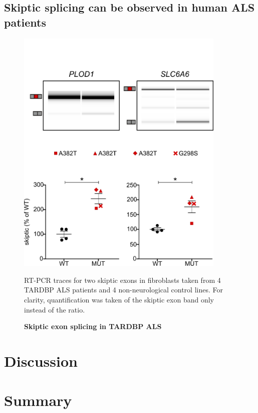 \subsection{Skiptic splicing can be observed in human ALS patients}
\begin{figure}[h!]
	\begin{center}
		\includegraphics[width=10cm]{Figures/05_tdp_mice/skiptic_patients.png}
	\end{center}
	\label{skiptic_patients}
	\caption{\textbf{Skiptic exon splicing in TARDBP ALS}}
		RT-PCR traces for two skiptic exons in fibroblasts taken from 4 TARDBP ALS patients and 4 non-neurological control lines. For clarity, quantification was taken of the skiptic exon band only instead of the ratio.
\end{figure}



\section{Discussion}

\section{Summary}


